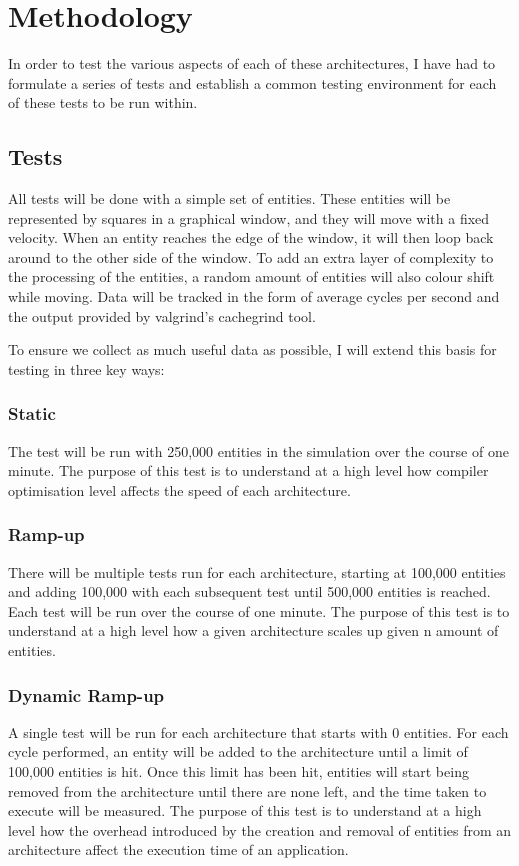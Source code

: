 \documentclass{article}
\begin{document}
\section{Methodology}
In order to test the various aspects of each of these architectures, I have had
to formulate a series of tests and establish a common testing environment for
each of these tests to be run within.

\subsection{Tests}
All tests will be done with a simple set of entities. These entities will be
represented by squares in a graphical window, and they will move with a fixed
velocity. When an entity reaches the edge of the window, it will then loop back
around to the other side of the window. To add an extra layer of complexity to
the processing of the entities, a random amount of entities will also colour
shift while moving. Data will be tracked in the form of average cycles per
second and the output provided by valgrind's cachegrind tool.

To ensure we collect as much useful data as possible, I will extend this basis
for testing in three key ways:

\subsubsection{Static}
The test will be run with 250,000 entities in the simulation over the course of
one minute. The purpose of this test is to understand at a high level how
compiler optimisation level affects the speed of each architecture.

\subsubsection{Ramp-up}
There will be multiple tests run for each architecture, starting at 100,000
entities and adding 100,000 with each subsequent test until 500,000 entities is
reached. Each test will be run over the course of one minute. The purpose of
this test is to understand at a high level how a given architecture scales up
given n amount of entities.

\subsubsection{Dynamic Ramp-up}
A single test will be run for each architecture that starts with 0 entities. For
each cycle performed, an entity will be added to the architecture until a limit
of 100,000 entities is hit. Once this limit has been hit, entities will start
being removed from the architecture until there are none left, and the time
taken to execute will be measured. The purpose of this test is to understand at
a high level how the overhead introduced by the creation and removal of entities
from an architecture affect the execution time of an application.
\end{document}
